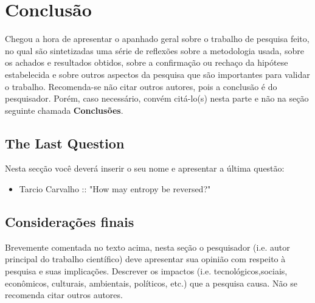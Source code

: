 \chapter{Conclusão}
\label{chap:conc}

Chegou a hora de apresentar o apanhado geral sobre o trabalho de
pesquisa feito, no qual s\~ao sintetizadas uma s\'erie de
reflex\~oes sobre a metodologia usada, sobre os achados e
resultados obtidos, sobre a confirma\c{c}\~ao ou recha\c{c}o da
hip\'otese estabelecida e sobre outros aspectos da pesquisa que
s\~ao importantes para validar o trabalho. Recomenda-se n\~ao
citar outros autores, pois a conclus\~ao \'e do pesquisador.
Por\'em, caso necess\'ario, conv\'em cit\'a-lo(s) nesta parte e
n\~ao na se\c{c}\~ao seguinte chamada \textbf{Conclus\~oes}.

\section{The Last Question}
Nesta secção você deverá inserir o seu nome e apresentar a última questão:

\begin{itemize}
    \item Tarcio Carvalho :: "How may entropy be reversed?"
\end{itemize}


\section{Considerações finais}
\label{sec:consid}

Brevemente comentada no texto acima, nesta se\c{c}\~ao o
pesquisador (i.e. autor principal do trabalho cient\'ifico) deve
apresentar sua opini\~ao com respeito \`a pesquisa e suas
implica\c{c}\~oes. Descrever os impactos (i.e.
tecnol\'ogicos,sociais, econ\^omicos, culturais, ambientais,
políticos, etc.) que a pesquisa causa. N\~ao se recomenda citar
outros autores.

